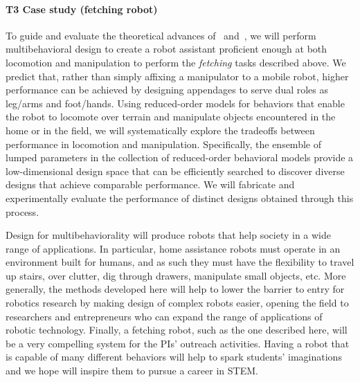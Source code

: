 \documentclass[11pt]{article}
\begin{document}
\paragraph{T3 Case study (fetching robot)} 
To guide and evaluate the theoretical advances of~ and~,
we will perform multibehavioral design to create a robot assistant proficient enough at both locomotion and manipulation to perform the \emph{fetching} tasks described above.
We predict that, rather than simply affixing a manipulator to a mobile robot, higher performance can be achieved by designing appendages to serve dual roles as leg/arms and foot/hands.
Using reduced-order models for behaviors that enable the robot to locomote over terrain and manipulate objects encountered in the home or in the field, we will systematically explore the tradeoffs between performance in locomotion and manipulation.
Specifically, the ensemble of lumped parameters in the collection of reduced-order behavioral models provide a low-dimensional design space that can be efficiently searched to discover diverse designs that achieve comparable performance.
We will fabricate and experimentally evaluate the performance of distinct designs obtained through this process.



Design for multibehaviorality will produce robots that help society in a wide range of applications. In particular, home assistance robots must operate in an environment built for humans,
and as such they must have the flexibility to travel up stairs, over clutter, dig through drawers, manipulate small objects, etc. More generally, the methods developed here will help to lower the barrier to entry for robotics research by making design of complex robots easier, opening the field to
researchers and entrepreneurs who can expand the range of applications
of robotic technology.
Finally, a fetching robot, such as the one described here, will be a very compelling system for the PIs' outreach activities. Having a robot that is capable of many different behaviors will help to spark students' imaginations and we hope will inspire them to pursue a career in STEM.
\end{document}
